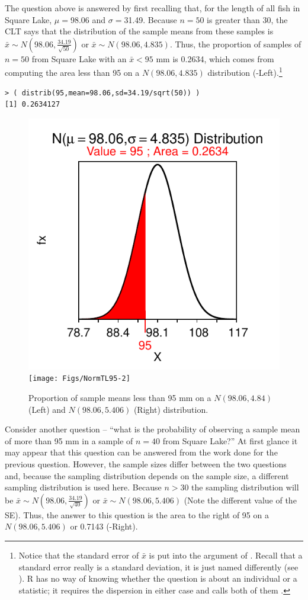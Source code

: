 \documentclass[10pt,openany]{book}\usepackage[]{graphicx}\usepackage[]{color}
\makeatletter
\newenvironment{kframe}{%
 \def\at@end@of@kframe{}%
 \ifinner\ifhmode%
  \def\at@end@of@kframe{\end{minipage}}%
  \begin{minipage}{\columnwidth}%
 \fi\fi%
 \def\FrameCommand##1{\hskip\@totalleftmargin \hskip-\fboxsep
 \colorbox{shadecolor}{##1}\hskip-\fboxsep
     \hskip-\linewidth \hskip-\@totalleftmargin \hskip\columnwidth}%
 \MakeFramed {\advance\hsize-\width
   \@totalleftmargin\z@ \linewidth\hsize
   \@setminipage}}%
 {\par\unskip\endMakeFramed%
 \at@end@of@kframe}
\newenvironment{knitrout}{}{} %
\makeatother
\begin{document}
The question above is answered by first recalling that, for the length of all fish in Square Lake, $\mu=$98.06 and $\sigma=$31.49. Because $n=50$ is greater than 30, the CLT says that the distribution of the sample means from these samples is $\bar{x}\sim N(98.06,\frac{34.19}{\sqrt{50}})$ or $\bar{x}\sim N(98.06,4.835)$. Thus, the proportion of samples of $n=50$ from Square Lake with an $\bar{x}<95$ mm is 0.2634, which comes from computing the area less than 95 on a $N(98.06,4.835)$ distribution (-Left).\footnote{Notice that the standard error of $\bar{x}$ is put into the  argument of . Recall that a standard error really is a standard deviation, it is just named differently (see ). R has no way of knowing whether the question is about an individual or a statistic; it requires the dispersion in either case and calls both of them .}

\begin{knitrout}
\color{fgcolor}\begin{kframe}
\begin{verbatim}
> ( distrib(95,mean=98.06,sd=34.19/sqrt(50)) )
[1] 0.2634127
\end{verbatim}
\end{kframe}\begin{figure}[hbtp]

{\centering \includegraphics[width=.3\textwidth]{Figs/NormTL95-1} 
\texttt{[image: Figs/NormTL95-2]} 

}

\caption[Proportion of sample means less than 95 mm on a $N(98.06,4.84)$ (Left) and $N(98.06,5.406)$ (Right) distribution]{Proportion of sample means less than 95 mm on a $N(98.06,4.84)$ (Left) and $N(98.06,5.406)$ (Right) distribution.}\label{fig:NormTL95}
\end{figure}


\end{knitrout}

Consider another question -- ``what is the probability of observing a sample mean of more than 95 mm in a sample of $n=40$ from Square Lake?''  At first glance it may appear that this question can be answered from the work done for the previous question. However, the sample sizes differ between the two questions and, because the sampling distribution depends on the sample size, a different sampling distribution is used here. Because $n>30$ the sampling distribution will be $\bar{x}\sim N(98.06,\frac{34.19}{\sqrt{40}})$ or $\bar{x}\sim N(98.06,5.406)$ (Note the different value of the SE). Thus, the answer to this question is the area to the right of 95 on a $N(98.06,5.406)$ or 0.7143 (-Right).
\end{document}

